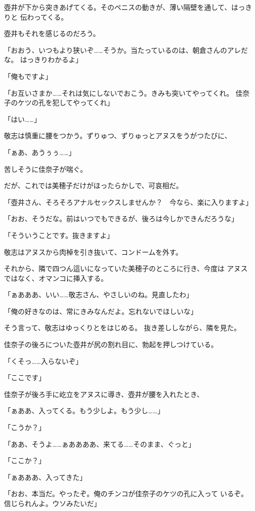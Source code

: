﻿\documentclass[
    book,tate,
    line_length=30zw,
    jafontsize=12pt,
    paper=b5j,
    landscape,
    ]{jlreq}
\begin{document}
壺井が下から突きあげてくる。そのペニスの動きが、薄い隔壁を通して、はっきりと
伝わってくる。

壺井もそれを感じるのだろう。

「おおう、いつもより狭いぞ……そうか。当たっているのは、朝倉さんのアレだな。
はっきりわかるよ」

「俺もですよ」

「お互いさまか……それは気にしないでおこう。きみも突いてやってくれ。
佳奈子のケツの孔を犯してやってくれ」

「はい……」

敬志は慎重に腰をつかう。ずりゅつ、ずりゅっとアヌスをうがつたびに、

「ぁあ、あうぅぅ……」

苦しそうに佳奈子が喘ぐ。

だが、これでは美穂子だけがほったらかしで、可哀相だ。

「壺井さん、そろそろアナルセックスしませんか？　今なら、楽に入りますよ」

「おお、そうだな。前はいつでもできるが、後ろは今しかできんだろうな」

「そういうことです。抜きますよ」

敬志はアヌスから肉棹を引き抜いて、コンドームを外す。

それから、隣で四つん這いになっていた美穂子のところに行き、今度は
アヌスではなく、オマンコに挿入する。

「ぁあああ、いい……敬志さん、やさしいのね。見直したわ」

「俺の好きなのは、常にきみなんだよ。忘れないでほしいな」

そう言って、敬志はゆっくりとをはじめる。
抜き差ししながら、隣を見た。

佳奈子の後ろについた壺井が尻の割れ目に、勃起を押しつけている。

「くそっ……入らないぞ」

「ここです」

佳奈子が後ろ手に屹立をアヌスに導き、壺井が腰を入れたとき、

「ぁああ、入ってくる。もう少しよ。もう少し……」

「こうか？」

「ああ、そうよ……ぁああああ、来てる……そのまま、ぐっと」

「ここか？」

「ぁあああ、入ってきた」

「おお、本当だ。やったぞ。俺のチンコが佳奈子のケツの孔に入って
いるぞ。信じられんよ。ウソみたいだ」
\end{document}

